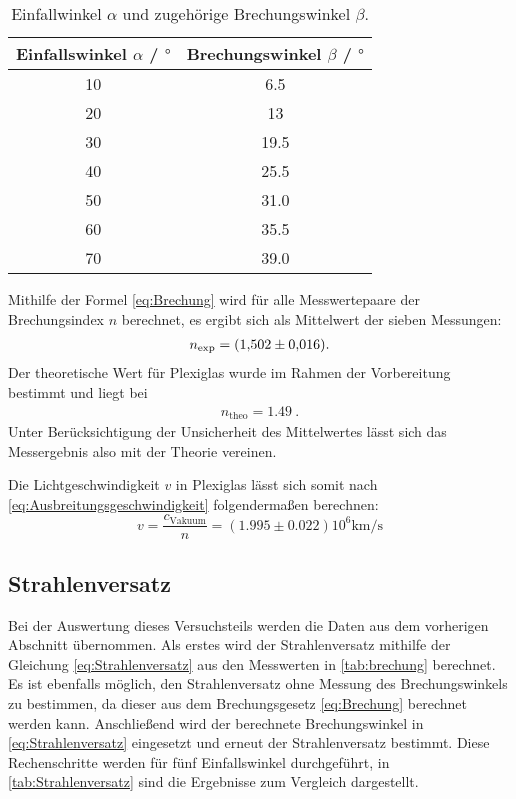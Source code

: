 \begin{table} [H]
    \centering
    \caption{Einfallwinkel $\alpha$ und zugehörige Brechungswinkel $\beta$.}
    \label{tab:brechung}
    \begin{tabular}{S S}
      \toprule
      {Einfallswinkel $\alpha$ / $\unit{\degree}$} & {Brechungswinkel $\beta$ / $\unit{\degree}$} \\
       & 6.5  \\
      20 & 13   \\
      30 & 19.5 \\
      40 & 25.5 \\
      50 & 31.0 \\
      60 & 35.5 \\
      70 & 39.0 \\
      \bottomrule
    \end{tabular}
\end{table}

Mithilfe der Formel \eqref{eq:Brechung} wird für alle Messwertepaare der Brechungsindex $n$ berechnet,
es ergibt sich als Mittelwert der sieben Messungen:
\begin{gather*}
    n_{\text{exp}}=\qty{1.502+-0.016}{}.
\end{gather*}
Der theoretische Wert für Plexiglas wurde im Rahmen der Vorbereitung bestimmt und liegt bei
\begin{gather*}
    n_{\text{theo}}=\qty{1.49}{}.
\end{gather*}
Unter Berücksichtigung der Unsicherheit des Mittelwertes lässt sich das Messergebnis also mit der Theorie vereinen.

Die Lichtgeschwindigkeit $v$ in Plexiglas lässt sich somit nach \eqref{eq:Ausbreitungsgeschwindigkeit} folgendermaßen berechnen:
\begin{equation*}
    v=\frac{c_{\text{Vakuum}}}{n}=(1.995\pm0.022)10^6\unit{\kilo\meter\per\second}
\end{equation*}

\subsection{Strahlenversatz}

Bei der Auswertung dieses Versuchsteils werden die Daten aus dem vorherigen Abschnitt übernommen.
Als erstes wird der Strahlenversatz mithilfe der Gleichung \eqref{eq:Strahlenversatz} aus den 
Messwerten in \autoref{tab:brechung} berechnet.
Es ist ebenfalls möglich, den Strahlenversatz ohne Messung des Brechungswinkels zu bestimmen, da dieser
aus dem Brechungsgesetz \eqref{eq:Brechung} berechnet werden kann.
Anschließend wird der berechnete Brechungswinkel in \eqref{eq:Strahlenversatz} eingesetzt und erneut
der Strahlenversatz bestimmt.
Diese Rechenschritte werden für fünf Einfallswinkel durchgeführt, in \autoref{tab:Strahlenversatz}
sind die Ergebnisse zum Vergleich dargestellt.


